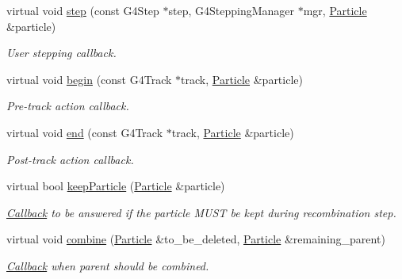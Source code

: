\begin{DoxyCompactItemize}
virtual void \hyperlink{class_d_d4hep_1_1_simulation_1_1_geant4_user_particle_handler_ac6a981e18ee2fa776907fda60aa54bb6}{step} (const G4Step $\ast$step, G4SteppingManager $\ast$mgr, \hyperlink{class_d_d4hep_1_1_simulation_1_1_geant4_particle}{Particle} \&particle)
\begin{DoxyCompactList}\small\item\em User stepping callback. \item\end{DoxyCompactList}\item 
virtual void \hyperlink{class_d_d4hep_1_1_simulation_1_1_geant4_user_particle_handler_a1a26c0a3a16679a1378cfcdfbc5800e2}{begin} (const G4Track $\ast$track, \hyperlink{class_d_d4hep_1_1_simulation_1_1_geant4_particle}{Particle} \&particle)
\begin{DoxyCompactList}\small\item\em Pre-\/track action callback. \item\end{DoxyCompactList}\item 
virtual void \hyperlink{class_d_d4hep_1_1_simulation_1_1_geant4_user_particle_handler_a327d267d834a00157ebd0b1e99e1685c}{end} (const G4Track $\ast$track, \hyperlink{class_d_d4hep_1_1_simulation_1_1_geant4_particle}{Particle} \&particle)
\begin{DoxyCompactList}\small\item\em Post-\/track action callback. \item\end{DoxyCompactList}\item 
virtual bool \hyperlink{class_d_d4hep_1_1_simulation_1_1_geant4_user_particle_handler_a34cc6206492754adfea2f007313512dc}{keepParticle} (\hyperlink{class_d_d4hep_1_1_simulation_1_1_geant4_particle}{Particle} \&particle)
\begin{DoxyCompactList}\small\item\em \hyperlink{class_d_d4hep_1_1_callback}{Callback} to be answered if the particle MUST be kept during recombination step. \item\end{DoxyCompactList}\item 
virtual void \hyperlink{class_d_d4hep_1_1_simulation_1_1_geant4_user_particle_handler_a8951aad04c7aaeb0ba39ef9e32d372cd}{combine} (\hyperlink{class_d_d4hep_1_1_simulation_1_1_geant4_particle}{Particle} \&to\_\-be\_\-deleted, \hyperlink{class_d_d4hep_1_1_simulation_1_1_geant4_particle}{Particle} \&remaining\_\-parent)
\begin{DoxyCompactList}\small\item\em \hyperlink{class_d_d4hep_1_1_callback}{Callback} when parent should be combined. \item\end{DoxyCompactList}\end{DoxyCompactItemize}

